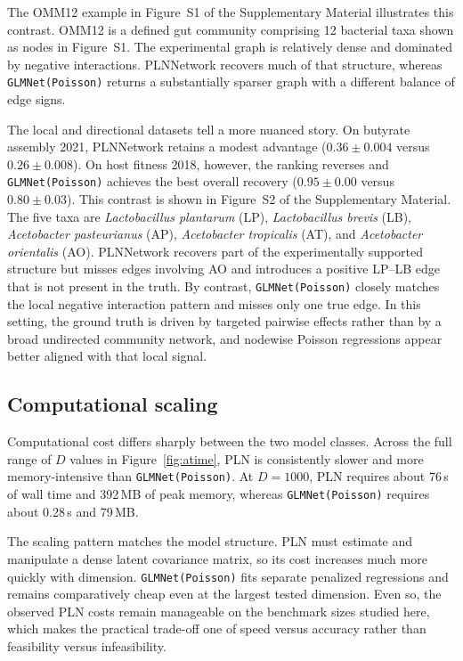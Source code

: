 \documentclass[useAMS,usenatbib,referee]{biom}
\begin{document}
The OMM12 example in Figure~S1 of the Supplementary Material illustrates this contrast.
OMM12 is a defined gut community comprising 12 bacterial taxa shown as nodes in Figure~S1.
The experimental graph is relatively dense and dominated by negative interactions.
PLNNetwork recovers much of that structure, whereas \texttt{GLMNet(Poisson)} returns a substantially sparser graph with a different balance of edge signs.

The local and directional datasets tell a more nuanced story.
On butyrate assembly 2021, PLNNetwork retains a modest advantage ($0.36 \pm 0.004$ versus $0.26 \pm 0.008$).
On host fitness 2018, however, the ranking reverses and \texttt{GLMNet(Poisson)} achieves the best overall recovery ($0.95 \pm 0.00$ versus $0.80 \pm 0.03$).
This contrast is shown in Figure~S2 of the Supplementary Material.
The five taxa are \textit{Lactobacillus plantarum} (LP), \textit{Lactobacillus brevis} (LB), \textit{Acetobacter pasteurianus} (AP), \textit{Acetobacter tropicalis} (AT), and \textit{Acetobacter orientalis} (AO).
PLNNetwork recovers part of the experimentally supported structure but misses edges involving AO and introduces a positive LP--LB edge that is not present in the truth.
By contrast, \texttt{GLMNet(Poisson)} closely matches the local negative interaction pattern and misses only one true edge.
In this setting, the ground truth is driven by targeted pairwise effects rather than by a broad undirected community network, and nodewise Poisson regressions appear better aligned with that local signal.

\subsection{Computational scaling}
\label{subsec:computational-scaling}

Computational cost differs sharply between the two model classes.
Across the full range of $D$ values in Figure~\ref{fig:atime}, PLN is consistently slower and more memory-intensive than \texttt{GLMNet(Poisson)}.
At $D = 1000$, PLN requires about 76\,s of wall time and 392\,MB of peak memory, whereas \texttt{GLMNet(Poisson)} requires about 0.28\,s and 79\,MB.

The scaling pattern matches the model structure.
PLN must estimate and manipulate a dense latent covariance matrix, so its cost increases much more quickly with dimension.
\texttt{GLMNet(Poisson)} fits separate penalized regressions and remains comparatively cheap even at the largest tested dimension.
Even so, the observed PLN costs remain manageable on the benchmark sizes studied here, which makes the practical trade-off one of speed versus accuracy rather than feasibility versus infeasibility.
\end{document}
